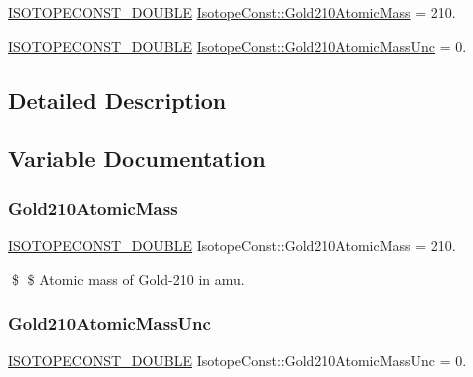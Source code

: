 \begin{DoxyCompactItemize}
\item 
\mbox{\hyperlink{group___isotope_const-_macros_ga8f45a7272ce02c0b4c65c44636ed719a}{I\+S\+O\+T\+O\+P\+E\+C\+O\+N\+S\+T\+\_\+\+D\+O\+U\+B\+LE}} \mbox{\hyperlink{group___isotope_const-_gold-_au210_ga0b17b18bc3f3c8ad514e43dd32cd67d8}{Isotope\+Const\+::\+Gold210\+Atomic\+Mass}} = 210.
\item 
\mbox{\hyperlink{group___isotope_const-_macros_ga8f45a7272ce02c0b4c65c44636ed719a}{I\+S\+O\+T\+O\+P\+E\+C\+O\+N\+S\+T\+\_\+\+D\+O\+U\+B\+LE}} \mbox{\hyperlink{group___isotope_const-_gold-_au210_gafb7c8eb3e7637e33b36f2a03e78459cd}{Isotope\+Const\+::\+Gold210\+Atomic\+Mass\+Unc}} = 0.
\end{DoxyCompactItemize}


\subsection{Detailed Description}


\subsection{Variable Documentation}
\mbox{\label{group___isotope_const-_gold-_au210_ga0b17b18bc3f3c8ad514e43dd32cd67d8}} 
\subsubsection{\texorpdfstring{Gold210\+Atomic\+Mass}{Gold210AtomicMass}}
{\footnotesize\ttfamily \mbox{\hyperlink{group___isotope_const-_macros_ga8f45a7272ce02c0b4c65c44636ed719a}{I\+S\+O\+T\+O\+P\+E\+C\+O\+N\+S\+T\+\_\+\+D\+O\+U\+B\+LE}} Isotope\+Const\+::\+Gold210\+Atomic\+Mass = 210.}

\$ \$ Atomic mass of Gold-\/210 in amu. \mbox{\label{group___isotope_const-_gold-_au210_gafb7c8eb3e7637e33b36f2a03e78459cd}} 
\subsubsection{\texorpdfstring{Gold210\+Atomic\+Mass\+Unc}{Gold210AtomicMassUnc}}
{\footnotesize\ttfamily \mbox{\hyperlink{group___isotope_const-_macros_ga8f45a7272ce02c0b4c65c44636ed719a}{I\+S\+O\+T\+O\+P\+E\+C\+O\+N\+S\+T\+\_\+\+D\+O\+U\+B\+LE}} Isotope\+Const\+::\+Gold210\+Atomic\+Mass\+Unc = 0.}

